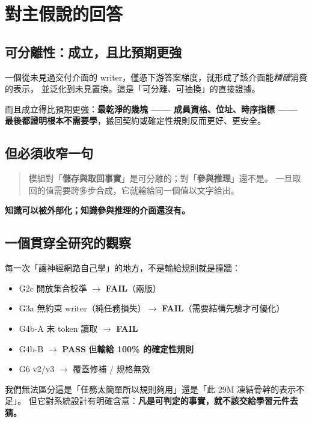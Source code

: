 \documentclass[11pt, a4paper]{article}
\newcommand{\PASS}{\textcolor{green!45!black}{\textbf{PASS}}}
\newcommand{\FAIL}{\textcolor{red!70!black}{\textbf{FAIL}}}
\begin{document}
\section{對主假說的回答}

\subsection{可分離性：成立，且比預期更強}

一個從未見過交付介面的 writer，僅憑下游答案梯度，就形成了該介面能\emph{精確}消費的表示，
並泛化到未見置換。這是「可分離、可抽換」的直接證據。

而且成立得比預期更強：\textbf{最乾淨的幾塊 —— 成員資格、位址、時序指標 ——
最後都證明根本不需要學}，搬回契約或確定性規則反而更好、更安全。

\subsection{但必須收窄一句}

\begin{quote}
模組對「\textbf{儲存與取回事實}」是可分離的；對「\textbf{參與推理}」還不是。
一旦取回的值需要跨多步合成，它就輸給同一個值以文字給出。
\end{quote}

\textbf{知識可以被外部化；知識參與推理的介面還沒有。}

\subsection{一個貫穿全研究的觀察}

每一次「讓神經網路自己學」的地方，不是輸給規則就是撞牆：

\begin{itemize}
  \item G2c 開放集合校準 $\to$ \FAIL{}（兩版）
  \item G3a 無約束 writer（純任務損失）$\to$ \FAIL{}（需要結構先驗才可優化）
  \item G4b-A 末 token 讀取 $\to$ \FAIL{}
  \item G4b-B $\to$ \PASS{} 但\textbf{輸給 100\% 的確定性規則}
  \item G6 v2/v3 $\to$ 覆蓋修補 / 規格無效
\end{itemize}

我們無法區分這是「任務太簡單所以規則夠用」還是「此 29M 凍結骨幹的表示不足」。
但它對系統設計有明確含意：\textbf{凡是可判定的事實，就不該交給學習元件去猜。}
\end{document}
